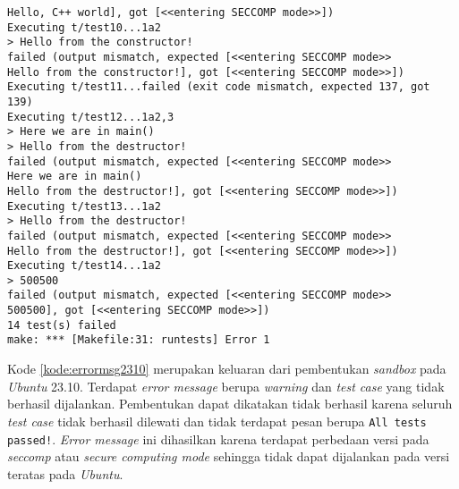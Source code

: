 \begin{lstlisting}[caption=\textit{Error message} pembangunan \textit{sandbox} pada \textit{Ubuntu} 23.10, label=kode:errormsg2310]
Hello, C++ world], got [<<entering SECCOMP mode>>])
Executing t/test10...1a2
> Hello from the constructor!
failed (output mismatch, expected [<<entering SECCOMP mode>>
Hello from the constructor!], got [<<entering SECCOMP mode>>])
Executing t/test11...failed (exit code mismatch, expected 137, got 139)
Executing t/test12...1a2,3
> Here we are in main()
> Hello from the destructor!
failed (output mismatch, expected [<<entering SECCOMP mode>>
Here we are in main()
Hello from the destructor!], got [<<entering SECCOMP mode>>])
Executing t/test13...1a2
> Hello from the destructor!
failed (output mismatch, expected [<<entering SECCOMP mode>>
Hello from the destructor!], got [<<entering SECCOMP mode>>])
Executing t/test14...1a2
> 500500
failed (output mismatch, expected [<<entering SECCOMP mode>>
500500], got [<<entering SECCOMP mode>>])
14 test(s) failed
make: *** [Makefile:31: runtests] Error 1
\end{lstlisting}
Kode \ref{kode:errormsg2310} merupakan keluaran dari pembentukan \textit{sandbox} pada \textit{Ubuntu} 23.10. Terdapat \textit{error message} berupa \textit{warning} dan \textit{test case} yang tidak berhasil dijalankan. Pembentukan dapat dikatakan tidak berhasil karena seluruh \textit{test case} tidak berhasil dilewati dan tidak terdapat pesan berupa \texttt{All tests passed!}. \textit{Error message} ini dihasilkan karena terdapat perbedaan versi pada \textit{seccomp} atau \textit{secure computing mode} sehingga tidak dapat dijalankan pada versi teratas pada \textit{Ubuntu}.